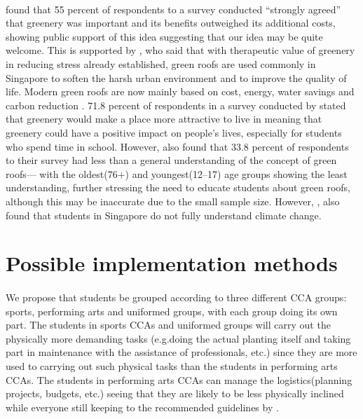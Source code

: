 \documentclass{article}
\begin{document}
\begin{multicols}{2}
  \paragraph{} \cite{CommAwareGBSyd} found that 55 percent of respondents
  to a survey conducted “strongly agreed” that greenery was important
  and its benefits outweighed its additional costs, showing public support
  of this idea suggesting that our idea may be quite welcome. This is
  supported by \cite{CFGRSG}, who said that with therapeutic value of
  greenery in reducing stress already established, green roofs are used
  commonly in Singapore to soften the harsh urban environment and to
  improve the quality of life. Modern green roofs are now mainly based on
  cost, energy, water savings and carbon reduction \cite{CFGRSG}.  71.8
  percent of respondents in a survey conducted by \cite{CommAwareGBSyd}
  stated that greenery would make a place more attractive to live in
  meaning that greenery could have a positive impact on people’s
  lives, especially for students who spend time in school. However,
  \cite{GRBuildEnSave} also found that 33.8 percent of respondents to
  their survey had less than a general understanding of the concept of
  green roofs--- with the oldest(76+) and youngest(12--17) age groups
  showing the least understanding, further stressing the need to educate
  students about green roofs, although this may be inaccurate due to
  the small sample size. However, \cite{student_carbon_footprint}, also
  found that students in Singapore do not fully understand climate change.



  \section{Possible implementation methods}
  \paragraph{} We propose that students be grouped according to three
  different CCA groups: sports, performing arts and uniformed groups,
  with each group doing its own part. The students in sports CCAs
  and uniformed groups will carry out the physically more demanding
  tasks (e.g.doing the actual planting itself and taking part in
  maintenance with the assistance of professionals, etc.) since they
  are more used to carrying out such physical tasks than the students in
  performing arts CCAs. The students in performing arts CCAs can manage
  the logistics(planning projects, budgets, etc.) seeing that they are
  likely to be less physically inclined while everyone still keeping to
  the recommended guidelines by \cite{HKGreenRoofGL}.




\end{multicols}
\end{document}
